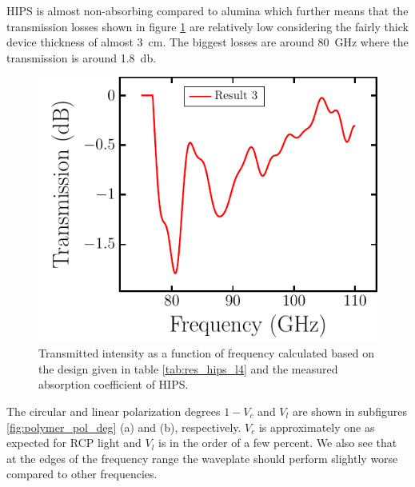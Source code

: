 HIPS is almost non-absorbing compared to alumina which further means that the transmission losses shown in figure \ref{fig:polymer_intensity} are relatively low considering the fairly thick device thickness of almost \SI{3}{\centi \meter}. The biggest losses are around \SI{80}{\giga \hertz} where the transmission is around \SI{1.8}{\decibel}.

\begin{figure}[H]
    \centering
    \includegraphics[scale=0.7]{images/results/plots/polymer/intensity.pdf}
    \caption{Transmitted intensity as a function of frequency calculated based on the design given in table \ref{tab:res_hips_l4} and the measured absorption coefficient of HIPS.}
    \label{fig:polymer_intensity}
\end{figure}

The circular and linear polarization degrees $1-V_c$ and $V_l$ are shown in subfigures \ref{fig:polymer_pol_deg} (a) and (b), respectively. $V_c$ is approximately one as expected for RCP light and $V_l$ is in the order of a few percent. We also see that at the edges of the frequency range the waveplate should perform slightly worse compared to other frequencies.

